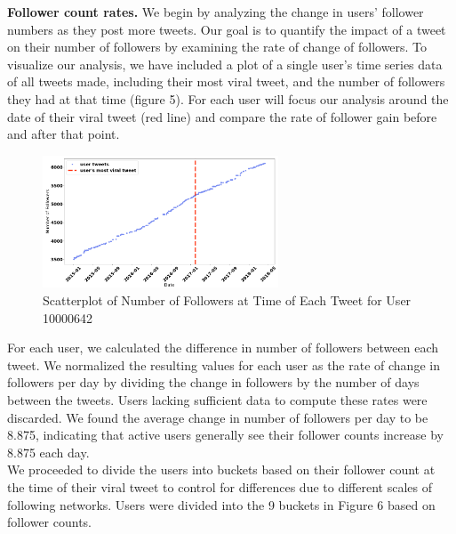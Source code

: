 \documentclass[twoside,twocolumn]{article}
\begin{document}
\textbf{Follower count rates.} We begin by analyzing the change in users’ follower numbers as they post more tweets. Our goal is to quantify the impact of a tweet on their number of followers by examining the rate of change of followers. To visualize our analysis, we have included a plot of a single user's time series data of all tweets made, including their most viral tweet, and the number of followers they had at that time (figure 5). For each user will focus our analysis around the date of their viral tweet (red line) and compare the rate of follower gain before and after that point.\\

\begin{figure}[h]
\includegraphics[width=7cm]{p5.png}
\caption{Scatterplot of Number of Followers at Time of Each Tweet for User 10000642}
\end{figure}

For each user, we calculated the difference in number of followers between each tweet. We normalized the resulting values for each user as the rate of change in followers per day by dividing the change in followers by the number of days between the tweets. Users lacking sufficient data to compute these rates were discarded. We found the average change in number of followers per day to be 8.875, indicating that active users generally see their follower counts increase by 8.875 each day.\\

We proceeded to divide the users into buckets based on their follower count at the time of their viral tweet to control for differences due to different scales of following networks. Users were divided into the 9 buckets in Figure 6 based on follower counts.
\end{document}
